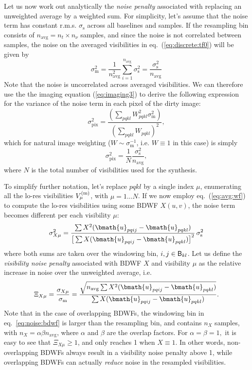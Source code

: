 \documentclass[useAMS,usenatbib]{mn2e}
\begin{document}
Let us now work out analytically the \emph{noise penalty} associated with replacing an unweighted average by 
a weighted sum. For simplicity, let's assume that the noise term
has constant r.m.s. $\sigma_\mathrm{s}$ across all baselines and samples. If the resampling bin 
consists of $n_\mathrm{avg} = n_t\times n_\nu$ samples, and since the noise is not correlated between samples, 
the noise on the averaged visibilities in eq.~(\ref{eq:discrete:tf0}) will be given by
\begin{equation}
\sigma_\mathrm{m}^2 = \frac{1}{n_\mathrm{avg}^2} \sum_{i=1}^{n_\mathrm{avg}} \sigma_\mathrm{s}^2  = \frac{\sigma_\mathrm{s}^2}{n_\mathrm{avg}}
\end{equation}
Note that the noise is uncorrelated across averaged visibilities. We can therefore use the
the imaging equation (\ref{eq:imaging3}) to derive the following expression for the variance of the noise 
term in each pixel of the dirty image:
\begin{equation}
\label{eq:noise:image}
\sigma_\mathrm{pix}^2 = \frac{ (\sum_{pqkl} W_{pqkl}^2 \sigma_\mathrm{m}^2) }{ (\sum_{pqkl} W_{pqkl})^2 },
\end{equation}
which for natural image weighting ($W\sim\sigma^{-1}_\mathrm{m}$, i.e. $W\equiv1$ in this case) is simply
\begin{equation}
\sigma_\mathrm{pix}^2 = \frac{1}{N}\frac{\sigma_\mathrm{s}^2}{n_\mathrm{avg}},
\end{equation}
where $N$ is the total number of visibilities used for the synthesis.

To simplify further notation, let's replace $pqkl$ by a single index $\mu$, enumerating all the lo-res visibilities $V^\mathrm{(m)}_\mu$, with 
$\mu=1\dots N$. If we now employ eq.~(\ref{eq:avg:wf}) to compute the lo-res visibilities using some BDWF $X(u,v)$, the noise 
term becomes different per each visibility $\mu$:
\begin{equation}
\label{eq:noise:bdwf}
\sigma_{X\mu}^2 = \frac{\sum X^2(\bmath{u}_{pqij}-\bmath{u}_{pqkl})}
{\big [ \sum X(\bmath{u}_{pqij}-\bmath{u}_{pqkl}) \big ]^2 } \, \sigma_\mathrm{s}^2
\end{equation}
where both sums are taken over the windowing bin, ${i,j}\in \mathsf{B}_{kl}$. Let us define 
the \emph{visibility noise penalty} associated with BDWF $X$ 
and visibility $\mu$ as the relative increase in noise over the unweighted average, i.e.
\begin{equation}
\Xi_{X\mu} = \frac{\sigma_{X\mu}}{\sigma_\mathrm{m}} = 
\frac{ \sqrt{ n_\mathrm{avg} \sum X^2(\bmath{u}_{pqij}-\bmath{u}_{pqkl}) }}
{\sum X(\bmath{u}_{pqij}-\bmath{u}_{pqkl}) }. 
\end{equation}
Note that in the case of overlapping BDWFs, the windowing bin in eq.~\ref{eq:noise:bdwf} is larger than the 
resampling bin, and contains $n_X$ samples, with $n_X=\alpha\beta n_\mathrm{avg}$, where $\alpha$ and $\beta$ are the 
overlap factors. For $\alpha=\beta=1,$ it is easy to see that $\Xi_{X\mu}\geq1$, and only reaches 1 when $X\equiv1$. 
In other words, non-overlapping BDWFs always result in a visibility noise penalty above 1, while overlapping BDWFs 
can actually \emph{reduce} noise in the resampled visibilities. 
\end{document}
